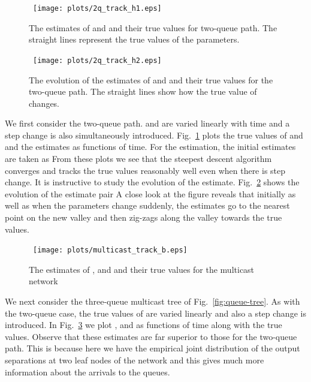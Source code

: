 \documentclass[11pt]{article}
\begin{document}
\begin{figure}
  \begin{center}
    \ \texttt{[image: plots/2q\_track\_h1.eps]}
  \end{center}
  \caption{The estimates of  and  and their true
    values for two-queue path. The straight lines represent the true
    values of the parameters.}
  \label{fig2q_a}
\end{figure}
\begin{figure}
  \begin{center}
    \ \texttt{[image: plots/2q\_track\_h2.eps]}
  \end{center}
  \caption{The evolution of the estimates of  and
     and their true values for the two-queue path. The
    straight lines show how the true value of 
    changes.  }
  \label{fig2q_b}
\end{figure}
We first consider the two-queue path.  and  are
varied linearly with time and a step change is also simultaneously
introduced. Fig.~\ref{fig2q_a} plots the true values of 
and  and the estimates as functions of time.  For the
estimation, the initial estimates are taken as  From these plots we see that the steepest
descent algorithm converges and tracks the true values reasonably well
even when there is step change. It is instructive to study the
evolution of the estimate. Fig.~\ref{fig2q_b} shows the evolution of
the estimate pair  A close look
at the figure reveals that initially as well as when the parameters
change suddenly, the estimates go to the nearest point on the new
valley and then zig-zags along the valley towards the true values.


\begin{figure}
  \begin{center}
    \
    \texttt{[image: plots/multicast\_track\_b.eps]}
  \end{center}
  \caption{The estimates of ,  and 
    and their true values for the multicast network}
  \label{fig_mult}
\end{figure}


We next consider the three-queue multicast tree of
Fig.~\ref{fig:queue-tree}. As with the two-queue case, the true values
of  are varied linearly and also a step change is
introduced. In Fig.~\ref{fig_mult} we plot ,
 and  as functions of time along
with the true values. Observe that these estimates are far superior to
those for the two-queue path. This is because here we have the
empirical joint distribution of the output separations at two leaf
nodes of the network and this gives much more information about the
arrivals to the queues.
\end{document}
